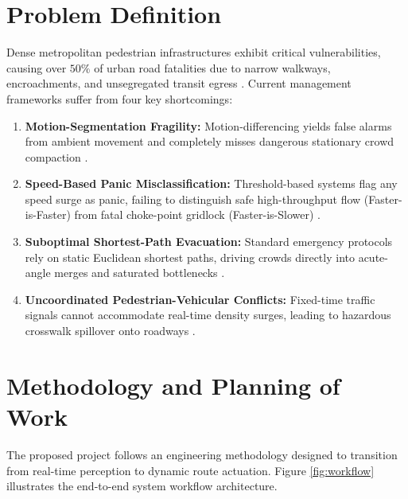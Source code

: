 \documentclass[12pt,a4paper]{article}
\begin{document}
\section{Problem Definition}
Dense metropolitan pedestrian infrastructures exhibit critical vulnerabilities, causing over $50\%$ of urban road fatalities due to narrow walkways, encroachments, and unsegregated transit egress \cite{maitra2024kolkata, morth2023report}. Current management frameworks suffer from four key shortcomings:
\begin{enumerate}
    \item \textbf{Motion-Segmentation Fragility:} Motion-differencing yields false alarms from ambient movement and completely misses dangerous stationary crowd compaction \cite{basalamah2020pedestrian, martinez2022computer}.
    \item \textbf{Speed-Based Panic Misclassification:} Threshold-based systems flag any speed surge as panic, failing to distinguish safe high-throughput flow (Faster-is-Faster) from fatal choke-point gridlock (Faster-is-Slower) \cite{liao2017faster, helbing2000simulating}.
    \item \textbf{Suboptimal Shortest-Path Evacuation:} Standard emergency protocols rely on static Euclidean shortest paths, driving crowds directly into acute-angle merges and saturated bottlenecks \cite{guy2010pledestrians, depta2014self}.
    \item \textbf{Uncoordinated Pedestrian-Vehicular Conflicts:} Fixed-time traffic signals cannot accommodate real-time density surges, leading to hazardous crosswalk spillover onto roadways \cite{maitra2024kolkata}.
\end{enumerate}

\section{Methodology and Planning of Work}
The proposed project follows an engineering methodology designed to transition from real-time perception to dynamic route actuation. Figure \ref{fig:workflow} illustrates the end-to-end system workflow architecture.
\end{document}
